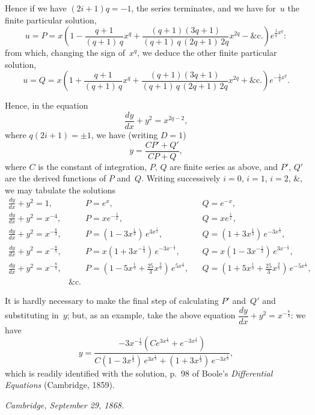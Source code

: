 \documentclass[11pt,a4paper]{article}
\theoremstyle{plain}
\theoremstyle{definition}
\begin{document}
Hence if we have $(2i+1)q=-1$, the series terminates, and we have for~$u$ the
finite particular solution,
\[
u = P = x\left(1 - \frac{q+1}{(q+1)\,q}x^q + \frac{(q+1)(3q+1)}{(q+1)\,q\,(2q+1)\,2q}x^{2q}
- \&\text{c.}\right)e^{\frac{1}{q}x^q}:
\]
from which, changing the sign of~$x^q$, we deduce the other finite particular solution,
\[
u = Q = x\left(1 + \frac{q+1}{(q+1)\,q}x^q + \frac{(q+1)(3q+1)}{(q+1)\,q\,(2q+1)\,2q}x^{2q}
+ \&\text{c.}\right)e^{-\frac{1}{q}x^q}.
\]

Hence, in the equation
\[
\frac{dy}{dx} + y^2 = x^{2q-2},
\]
where $q(2i+1) = \pm 1$, we have (writing $D=1$)
\[
y = \frac{CP' + Q'}{CP + Q},
\]
where $C$ is the constant of integration, $P$, $Q$ are finite series as above, and
$P'$, $Q'$ are the derived functions of $P$ and~$Q$.  Writing successively $i=0$, $i=1$,
$i=2$, \&, we may tabulate the solutions
\begin{align*}
\frac{dy}{dx} + y^2 = 1,       &\qquad P = e^x,            && Q = e^{-x}, \\
\frac{dy}{dx} + y^2 = x^{-4},  &\qquad P = xe^{-\frac{1}{x}}, && Q = xe^{\frac{1}{x}}, \\
\frac{dy}{dx} + y^2 = x^{-\frac{8}{3}}, &\qquad
P = (1 - 3x^{\frac{1}{3}})\,e^{3x^{\frac{1}{3}}}, &&
Q = (1 + 3x^{\frac{1}{3}})\,e^{-3x^{\frac{1}{3}}}, \\
\frac{dy}{dx} + y^2 = x^{-\frac{8}{5}}, &\qquad
P = x(1 + 3x^{-\frac{1}{3}})\,e^{-3x^{-\frac{1}{3}}}, &&
Q = x(1 - 3x^{-\frac{1}{3}})\,e^{3x^{-\frac{1}{3}}}, \\
\frac{dy}{dx} + y^2 = x^{-\frac{8}{5}}, &\qquad
P = (1 - 5x^{\frac{1}{5}} + \tfrac{25}{3}x^{\frac{2}{5}})\,e^{5x^{\frac{1}{5}}}, &&
Q = (1 + 5x^{\frac{1}{5}} + \tfrac{25}{3}x^{\frac{2}{5}})\,e^{-5x^{\frac{1}{5}}}, \\
&\&\text{c.}
\end{align*}

It is hardly necessary to make the final step of calculating $P'$ and~$Q'$ and
substituting in~$y$; but, as an example, take the above equation
$\dfrac{dy}{dx} + y^2 = x^{-\frac{8}{3}}$: we have
\[
y = \frac{-3x^{-\frac{1}{3}}(Ce^{3x^{\frac{1}{3}}} + e^{-3x^{\frac{1}{3}}})}
{C(1-3x^{\frac{1}{3}})\,e^{3x^{\frac{1}{3}}} + (1+3x^{\frac{1}{3}})\,e^{-3x^{\frac{1}{3}}}},
\]
which is readily identified with the solution, p.~98 of Boole's \textit{Differential
Equations} (Cambridge, 1859).

\begin{flushright}
\textit{Cambridge, September 29, 1868.}
\end{flushright}
\end{document}
